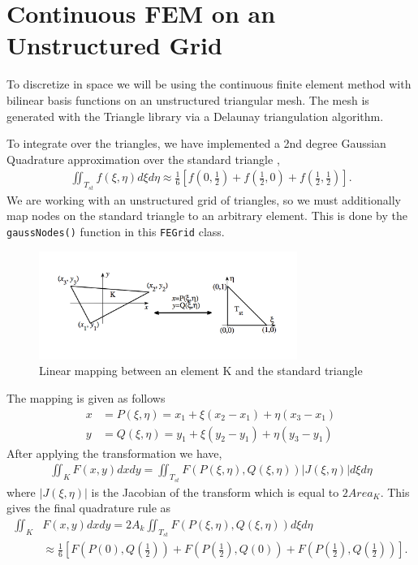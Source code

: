 \section{Continuous FEM on an Unstructured Grid}
To discretize in space we will be using the continuous finite element method with bilinear basis functions on an unstructured triangular mesh. The mesh is generated with the Triangle library \cite{shewchuk96b} via a Delaunay triangulation algorithm. 
\par
To integrate over the triangles, we have implemented a 2nd degree Gaussian Quadrature approximation over the standard triangle \cite{Deng2010},
\begin{align}
    \iint_{T_{st}} f(\xi, \eta) d\xi d\eta \approx \frac{1}{6}\left [ f\left( 0, \frac{1}{2} \right ) + f \left( \frac{1}{2}, 0 \right) + f \left( \frac{1}{2}, \frac{1}{2} \right)\right].
\end{align}
We are working with an unstructured grid of triangles, so we must additionally map nodes on the standard triangle to an arbitrary element. This is done by the \texttt{gaussNodes()} function in this \texttt{FEGrid} class. 
\begin{figure}[h]
    \centering
    \includegraphics[width=0.75\textwidth]{fig/TriangleMapping}
    \caption{Linear mapping between an element K and the standard triangle \cite{Deng2010}}
    \label{fig:my_label}
\end{figure}
The mapping is given as follows
\begin{align}
    x &= P(\xi, \eta) = x_1 + \xi(x_2 - x_1) + \eta(x_3 - x_1) \\
    y &= Q(\xi, \eta) = y_1 + \xi(y_2 - y_1) + \eta(y_3 - y_1)
\end{align}
After applying the transformation we have,
\begin{align}
 \iint_{K} F(x, y) dx dy = \iint_{T_{st}}F(P(\xi, \eta), Q(\xi, \eta))|J(\xi, \eta)|d\xi d\eta
\end{align}
where $|J(\xi, \eta)|$ is the Jacobian of the transform which is equal to $2Area_K$. This gives the final quadrature rule as
\begin{align}
 \iint_{K} &F(x, y) dx dy = 2A_k\iint_{T_{st}}F(P(\xi, \eta), Q(\xi, \eta))d\xi d\eta \\
 &\approx \frac{1}{6}\left [ F\left( P(0), Q(\frac{1}{2}) \right) + F \left( P(\frac{1}{2}), Q(0) \right) + F \left( P(\frac{1}{2}), Q(\frac{1}{2}) \right)\right].
\end{align}

